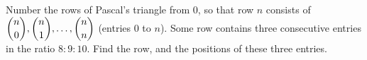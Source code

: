 Number the rows of Pascal's triangle from $0$, so that row $n$ consists of $\dbinom n0,\dbinom n1,\dots,\dbinom nn$ (entries $0$ to $n$). Some row contains three consecutive entries in the ratio $8:9:10$. Find the row, and the positions of these three entries.
